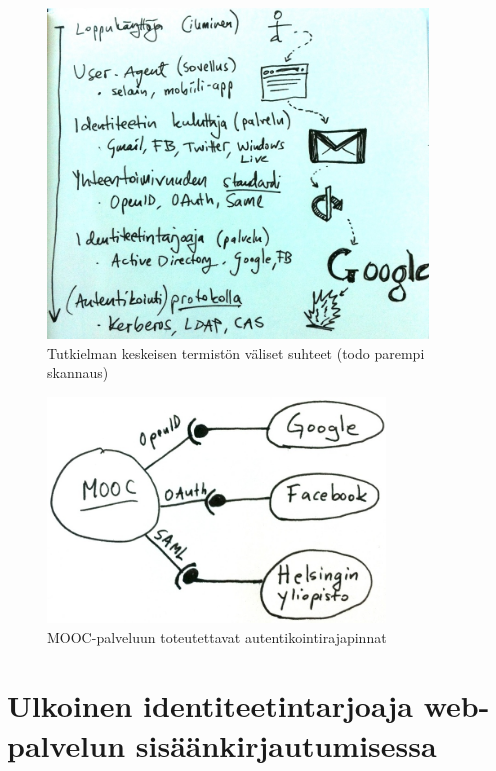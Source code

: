 \documentclass[finnish,gradu]{tktltiki}
\begin{document}
  \begin{figure}[h!]
    \centering
    \includegraphics[width=0.9\textwidth]{images/auth_yleiskuva.jpg}
    \caption{Tutkielman keskeisen termistön väliset suhteet (todo parempi skannaus)}
    \label{fig:yleiskuva_termien_suhteista}
  \end{figure}

  \begin{figure}
    \centering
    \includegraphics[width=0.8\textwidth]{images/mooc-autentikointirajapinnat.jpg}
    \caption{MOOC-palveluun toteutettavat autentikointirajapinnat}
    \label{fig:mooc-autentikointirajapinnat}
  \end{figure}




\section{Ulkoinen identiteetintarjoaja web-palvelun sisäänkirjautumisessa} %
\label{sec:kakkosluku}
\end{document}

